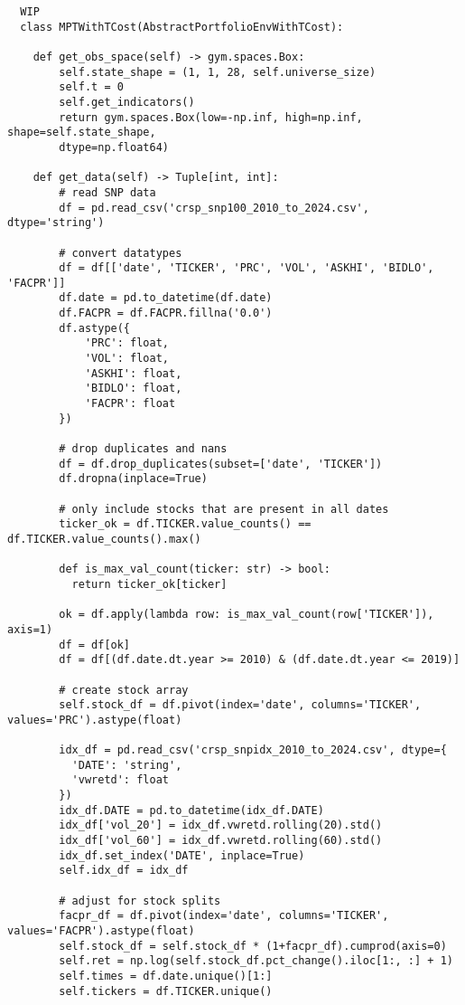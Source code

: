 \begin{verbatim}
  WIP
  class MPTWithTCost(AbstractPortfolioEnvWithTCost):

    def get_obs_space(self) -> gym.spaces.Box:
        self.state_shape = (1, 1, 28, self.universe_size)
        self.t = 0
        self.get_indicators()
        return gym.spaces.Box(low=-np.inf, high=np.inf, shape=self.state_shape, 
        dtype=np.float64)
    
    def get_data(self) -> Tuple[int, int]:
        # read SNP data
        df = pd.read_csv('crsp_snp100_2010_to_2024.csv', dtype='string')
    
        # convert datatypes
        df = df[['date', 'TICKER', 'PRC', 'VOL', 'ASKHI', 'BIDLO', 'FACPR']]
        df.date = pd.to_datetime(df.date)
        df.FACPR = df.FACPR.fillna('0.0')
        df.astype({
            'PRC': float,
            'VOL': float,
            'ASKHI': float,
            'BIDLO': float,
            'FACPR': float
        })
    
        # drop duplicates and nans
        df = df.drop_duplicates(subset=['date', 'TICKER'])
        df.dropna(inplace=True)
    
        # only include stocks that are present in all dates
        ticker_ok = df.TICKER.value_counts() == df.TICKER.value_counts().max()

        def is_max_val_count(ticker: str) -> bool:
          return ticker_ok[ticker]
        
        ok = df.apply(lambda row: is_max_val_count(row['TICKER']), axis=1)
        df = df[ok]
        df = df[(df.date.dt.year >= 2010) & (df.date.dt.year <= 2019)]
    
        # create stock array
        self.stock_df = df.pivot(index='date', columns='TICKER', values='PRC').astype(float)
        
        idx_df = pd.read_csv('crsp_snpidx_2010_to_2024.csv', dtype={
          'DATE': 'string',
          'vwretd': float
        })
        idx_df.DATE = pd.to_datetime(idx_df.DATE)
        idx_df['vol_20'] = idx_df.vwretd.rolling(20).std()
        idx_df['vol_60'] = idx_df.vwretd.rolling(60).std()
        idx_df.set_index('DATE', inplace=True)
        self.idx_df = idx_df

        # adjust for stock splits
        facpr_df = df.pivot(index='date', columns='TICKER', values='FACPR').astype(float)
        self.stock_df = self.stock_df * (1+facpr_df).cumprod(axis=0)
        self.ret = np.log(self.stock_df.pct_change().iloc[1:, :] + 1)
        self.times = df.date.unique()[1:]
        self.tickers = df.TICKER.unique()


\end{verbatim}
